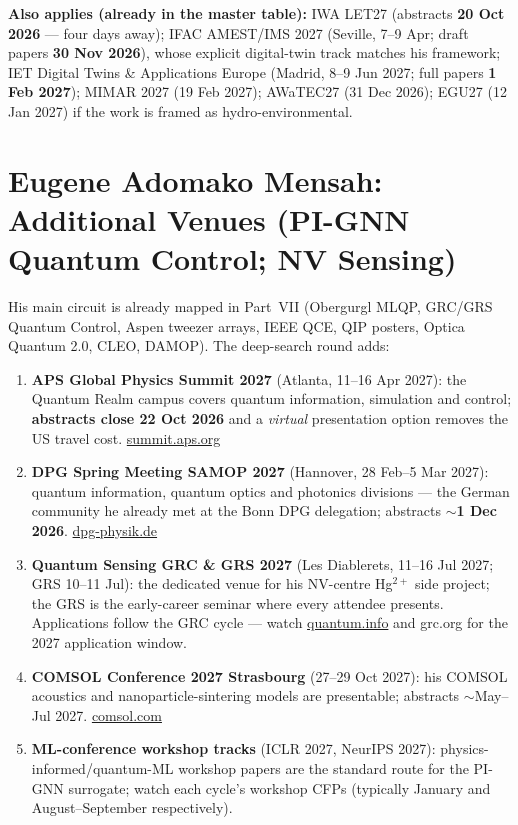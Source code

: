 \documentclass[11pt,a4paper]{article}
\begin{document}
\noindent\textbf{Also applies (already in the master table):} IWA LET27 (abstracts \textbf{20 Oct 2026} --- four days away); IFAC AMEST/IMS 2027 (Seville, 7--9 Apr; draft papers \textbf{30 Nov 2026}), whose explicit digital-twin track matches his framework; IET Digital Twins \& Applications Europe (Madrid, 8--9 Jun 2027; full papers \textbf{1 Feb 2027}); MIMAR 2027 (19 Feb 2027); AWaTEC27 (31 Dec 2026); EGU27 (12 Jan 2027) if the work is framed as hydro-environmental.

\section{Eugene Adomako Mensah: Additional Venues (PI-GNN Quantum Control; NV Sensing)}

\noindent His main circuit is already mapped in Part~VII (Obergurgl MLQP, GRC/GRS Quantum Control, Aspen tweezer arrays, IEEE QCE, QIP posters, Optica Quantum 2.0, CLEO, DAMOP). The deep-search round adds:

\begin{enumerate}[leftmargin=1.6em]
  \item \textbf{APS Global Physics Summit 2027} (Atlanta, 11--16 Apr 2027): the Quantum Realm campus covers quantum information, simulation and control; \textbf{abstracts close 22 Oct 2026} and a \emph{virtual} presentation option removes the US travel cost. \href{https://summit.aps.org/attend/abstracts}{summit.aps.org}
  \item \textbf{DPG Spring Meeting SAMOP 2027} (Hannover, 28 Feb--5 Mar 2027): quantum information, quantum optics and photonics divisions --- the German community he already met at the Bonn DPG delegation; abstracts $\sim$\textbf{1 Dec 2026}. \href{https://www.dpg-physik.de/aktivitaeten-und-programme/tagungen/fruehjahrstagungen/2027}{dpg-physik.de}
  \item \textbf{Quantum Sensing GRC \& GRS 2027} (Les Diablerets, 11--16 Jul 2027; GRS 10--11 Jul): the dedicated venue for his NV-centre Hg$^{2+}$ side project; the GRS is the early-career seminar where every attendee presents. Applications follow the GRC cycle --- watch \href{https://quantum.info/conf/2027.html}{quantum.info} and grc.org for the 2027 application window.
  \item \textbf{COMSOL Conference 2027 Strasbourg} (27--29 Oct 2027): his COMSOL acoustics and nanoparticle-sintering models are presentable; abstracts $\sim$May--Jul 2027. \href{https://www.comsol.com/events/special/comsol-conference-2027-strasbourg-139292}{comsol.com}
  \item \textbf{ML-conference workshop tracks} (ICLR 2027, NeurIPS 2027): physics-informed/quantum-ML workshop papers are the standard route for the PI-GNN surrogate; watch each cycle's workshop CFPs (typically January and August--September respectively).
\end{enumerate}
\end{document}
